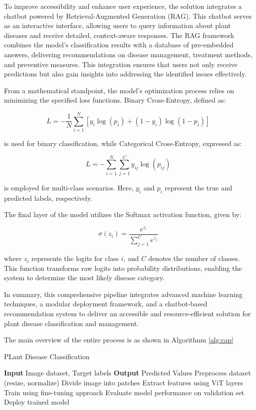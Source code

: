 To improve accessibility and enhance user experience, the solution integrates a chatbot powered by Retrieval-Augmented Generation (RAG). This chatbot serves as an interactive interface, allowing users to query information about plant diseases and receive detailed, context-aware responses. The RAG framework combines the model’s classification results with a database of pre-embedded answers, delivering recommendations on disease management, treatment methods, and preventive measures. This integration ensures that users not only receive predictions but also gain insights into addressing the identified issues effectively.  

From a mathematical standpoint, the model’s optimization process relies on minimizing the specified loss functions. Binary Cross-Entropy, defined as:  

\[
L = -\frac{1}{N} \sum_{i=1}^{N} \left[ y_i \log(p_i) + (1 - y_i) \log(1 - p_i) \right]
\]  

is used for binary classification, while Categorical Cross-Entropy, expressed as:  

\[
L = -\sum_{i=1}^{N} \sum_{j=1}^{C} y_{ij} \log(p_{ij})
\]  

is employed for multi-class scenarios. Here, \( y_i \) and \( p_i \) represent the true and predicted labels, respectively.  

The final layer of the model utilizes the Softmax activation function, given by:  

\[
\sigma(z_i) = \frac{e^{z_i}}{\sum_{j=1}^{C} e^{z_j}}
\]  

where \( z_i \) represents the logits for class \( i \), and \( C \) denotes the number of classes. This function transforms raw logits into probability distributions, enabling the system to determine the most likely disease category.  

In summary, this comprehensive pipeline integrates advanced machine learning techniques, a modular deployment framework, and a chatbot-based recommendation system to deliver an accessible and resource-efficient solution for plant disease classification and management.

The main overview of the entire process is as shown in Algorithnm \ref{alg:cap}

\begin{algorithm}[h]
\caption{PLant Disease Classification }\label{alg:cap}
\begin{algorithmic}[1]
\State \textbf{Input} Image dataset, Target labels\;
\State \textbf{Output} Predicted Values\;
\State Preprocess dataset (resize, normalize)\;
\State Divide image into patches\;
\State Extract features using ViT layers\;
\State Train using fine-tuning approach\;
\State Evaluate model performance on validation set\;
\State Deploy trained model\;

\end{algorithmic} 

\end{algorithm}


